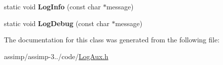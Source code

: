 \begin{DoxyCompactItemize}
\item 
\hypertarget{class_assimp_1_1_log_functions_a4ae80f5addc255fd8ba975c2747fd350}{static void {\bfseries Log\+Info} (const char $\ast$message)}\label{class_assimp_1_1_log_functions_a4ae80f5addc255fd8ba975c2747fd350}

\item 
\hypertarget{class_assimp_1_1_log_functions_a62203c62733d8ea5be4130737c12ff93}{static void {\bfseries Log\+Debug} (const char $\ast$message)}\label{class_assimp_1_1_log_functions_a62203c62733d8ea5be4130737c12ff93}

\end{DoxyCompactItemize}


The documentation for this class was generated from the following file\+:\begin{DoxyCompactItemize}
\item 
assimp/assimp-\/3../code/\hyperlink{_log_aux_8h}{Log\+Aux.\+h}\end{DoxyCompactItemize}
